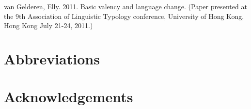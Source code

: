 \documentclass[output=paper]{langsci/langscibook}
\begin{document}
van Gelderen, Elly. 2011. Basic valency and language change. (Paper presented at the 9th Association of Linguistic Typology conference, University of Hong Kong, Hong Kong July 21-24, 2011.)


\section*{Abbreviations}
\section*{Acknowledgements}

{\sloppy
\printbibliography[heading=subbibliography,notkeyword=this]
}
\end{document}

